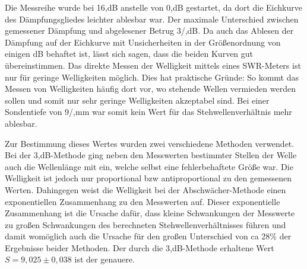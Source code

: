 Die Messreihe wurde bei 16,dB anstelle von 0,dB gestartet, da dort die Eichkurve des Dämpfungsgliedes leichter ablesbar war.
Der maximale Unterschied zwischen gemessener Dämpfung und abgelesener Betrug 3/,dB.
Da auch das Ablesen der Dämpfung auf der Eichkurve mit Unsicherheiten in der Größenordnung von einigen dB behaftet ist, lässt sich sagen, dass die beiden Kurven gut übereinstimmen.
Das direkte Messen der Welligkeit mittels eines SWR-Meters ist nur  für geringe Welligkeiten möglich.
Dies hat praktische Gründe:
So kommt das Messen von Welligkeiten häufig dort vor, wo stehende Wellen vermieden werden sollen und somit nur sehr geringe Welligkeiten akzeptabel sind.
Bei einer Sondentiefe von 9/,mm war somit kein Wert für das Stehwellenverhältnis mehr ablesbar.

Zur Bestimmung dieses Wertes wurden zwei verschiedene Methoden verwendet.
Bei der 3,dB-Methode ging neben den Messwerten bestimmter Stellen der Welle auch die Wellenlänge mit ein, welche selbst eine fehlerbehaftete Größe war.
Die Welligkeit ist jedoch nur proportional bzw antiproportional zu den gemessenen Werten.
Dahingegen weist die Welligkeit bei der Abschwächer-Methode einen exponentiellen Zusammenhang zu den Messwerten auf.
Dieser exponentielle Zusammenhang ist die Ursache dafür, dass kleine Schwankungen der Messwerte zu großen Schwankungen des berechneten Stehwellenverhältnisses führen und damit womöglich auch die Ursache für den großen Unterschied von ca 28\% der Ergebnisse beider Methoden.
Der durch die 3,dB-Methode erhaltene Wert $S = 9,025 \pm 0,038$ ist der genauere.
























